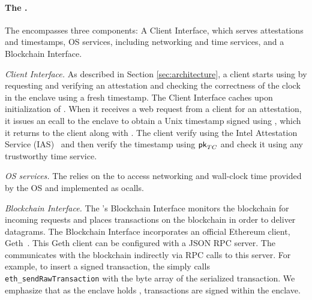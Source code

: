 \paragraph{The \medname.} The \medname encompasses three components: A Client Interface, which serves attestations and timestamps, OS services, including networking and time services, and a Blockchain Interface. 

\vspace{2mm}

\noindent\emph{Client Interface.} As described in Section \ref{sec:architecture},
a client starts using \tc by requesting and verifying an attestation \att and checking the correctness of the clock in the \tc enclave using a fresh timestamp.
The Client Interface caches \att upon initialization of \engine. When it receives a web request from a client for an attestation,
it issues an ecall to the enclave to obtain a
Unix timestamp signed using \skTC, which it returns to the client along with \att. The client verify \att 
using the Intel Attestation Service (IAS)~\cite{} and then verify the timestamp using ${\sf pk}_{TC}$ and check it using any trustworthy time service. 

\vspace{2mm}

\noindent\emph{OS services.} The \encname relies on the \medname to access networking and 
wall-clock time provided by the OS and implemented as ocalls.

\vspace{2mm}

\noindent\emph{Blockchain Interface.} The \medname's Blockchain Interface monitors the
blockchain for incoming requests and places transactions on the blockchain in order to
deliver datagrams. The Blockchain Interface incorporates an 
official Ethereum client, Geth~\cite{geth}. This Geth client can be configured with a JSON RPC server.  
The \medname  communicates with the blockchain indirectly via RPC calls to this server. For example, to insert a signed transaction, the \medname simply calls
\texttt{eth\_sendRawTransaction} with the byte array of the serialized
transaction. We emphasize that as the enclave holds \skTC, transactions are signed within the enclave.


